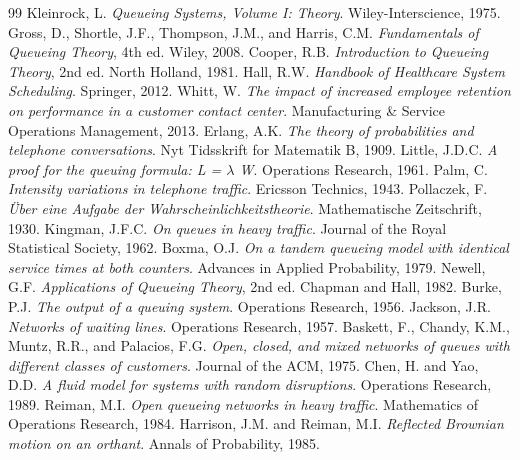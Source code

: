 \documentclass[a4paper, 11pt]{article}
\begin{document}
\begin{thebibliography}{99}
 Kleinrock, L. \textit{Queueing Systems, Volume I: Theory}. Wiley-Interscience, 1975.
 Gross, D., Shortle, J.F., Thompson, J.M., and Harris, C.M. \textit{Fundamentals of Queueing Theory}, 4th ed. Wiley, 2008.
 Cooper, R.B. \textit{Introduction to Queueing Theory}, 2nd ed. North Holland, 1981.
 Hall, R.W. \textit{Handbook of Healthcare System Scheduling}. Springer, 2012.
 Whitt, W. \textit{The impact of increased employee retention on performance in a customer contact center}. Manufacturing \& Service Operations Management, 2013.
 Erlang, A.K. \textit{The theory of probabilities and telephone conversations}. Nyt Tidsskrift for Matematik B, 1909.
 Little, J.D.C. \textit{A proof for the queuing formula: L = $\lambda$ W}. Operations Research, 1961.
 Palm, C. \textit{Intensity variations in telephone traffic}. Ericsson Technics, 1943.
 Pollaczek, F. \textit{Über eine Aufgabe der Wahrscheinlichkeitstheorie}. Mathematische Zeitschrift, 1930.
 Kingman, J.F.C. \textit{On queues in heavy traffic}. Journal of the Royal Statistical Society, 1962.
 Boxma, O.J. \textit{On a tandem queueing model with identical service times at both counters}. Advances in Applied Probability, 1979.
 Newell, G.F. \textit{Applications of Queueing Theory}, 2nd ed. Chapman and Hall, 1982.
 Burke, P.J. \textit{The output of a queuing system}. Operations Research, 1956.
 Jackson, J.R. \textit{Networks of waiting lines}. Operations Research, 1957.
 Baskett, F., Chandy, K.M., Muntz, R.R., and Palacios, F.G. \textit{Open, closed, and mixed networks of queues with different classes of customers}. Journal of the ACM, 1975.
 Chen, H. and Yao, D.D. \textit{A fluid model for systems with random disruptions}. Operations Research, 1989.
 Reiman, M.I. \textit{Open queueing networks in heavy traffic}. Mathematics of Operations Research, 1984.
 Harrison, J.M. and Reiman, M.I. \textit{Reflected Brownian motion on an orthant}. Annals of Probability, 1985.
\end{thebibliography}
\end{document}

